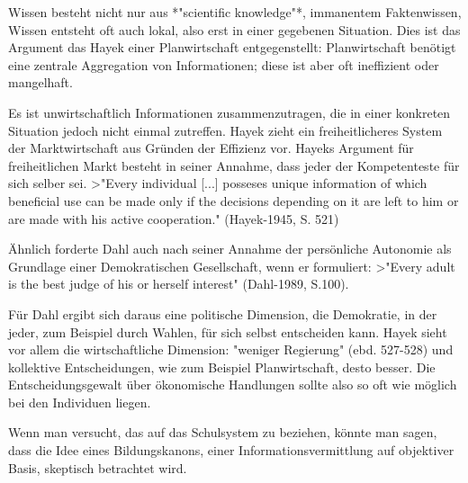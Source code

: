 Wissen besteht nicht nur aus *"scientific knowledge"*, immanentem Faktenwissen,  Wissen entsteht oft auch lokal, also erst in einer gegebenen Situation.
Dies ist das Argument das Hayek einer Planwirtschaft entgegenstellt:
Planwirtschaft benötigt eine zentrale Aggregation von Informationen; diese ist aber oft ineffizient oder mangelhaft.

Es ist unwirtschaftlich Informationen zusammenzutragen, die in einer konkreten Situation jedoch nicht einmal zutreffen.
Hayek zieht ein freiheitlicheres System der Marktwirtschaft aus Gründen der Effizienz vor.
Hayeks Argument für freiheitlichen Markt besteht in seiner Annahme, dass jeder der Kompetenteste für sich selber sei.
>"Every individual [...] posseses unique information of which beneficial use can be made only if the decisions depending on it are left to him or are made with his active cooperation." (Hayek-1945, S. 521)

Ähnlich forderte Dahl auch nach seiner Annahme der persönliche Autonomie als Grundlage einer Demokratischen Gesellschaft, wenn er formuliert:
>"Every adult is the best judge of his or herself interest" (Dahl-1989, S.100).

Für Dahl ergibt sich daraus eine politische Dimension, die Demokratie, in der jeder, zum Beispiel durch Wahlen, für sich selbst entscheiden kann.
Hayek sieht vor allem die wirtschaftliche Dimension: "weniger Regierung" (ebd. 527-528) und kollektive Entscheidungen, wie zum Beispiel Planwirtschaft, desto besser.
Die Entscheidungsgewalt über ökonomische Handlungen sollte also so oft wie möglich bei den Individuen liegen.

Wenn man versucht, das auf das Schulsystem zu beziehen, könnte man sagen, dass die Idee eines Bildungskanons, einer Informationsvermittlung auf objektiver Basis, skeptisch betrachtet wird.
